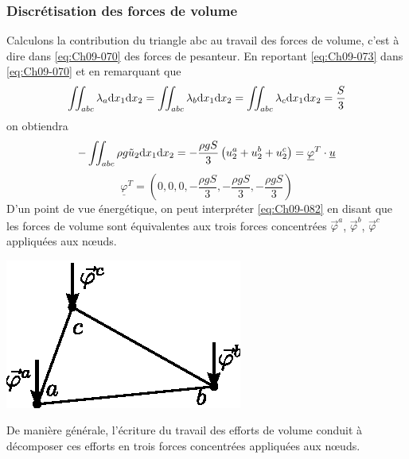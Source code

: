 \subsubsection{Discrétisation des forces de volume}
Calculons la contribution du triangle abc au travail des forces de volume, c'est à dire dans \eqref{eq:Ch09-070} des forces de pesanteur.
En reportant \eqref{eq:Ch09-073} dans \eqref{eq:Ch09-070} et en remarquant que 
\begin{equation}
    \iint_{abc} \lambda_a \mathrm{d} x_1 \mathrm{d} x_2 = \iint_{abc} \lambda_b \mathrm{d} x_1 \mathrm{d} x_2 = \iint_{abc} \lambda_c \mathrm{d} x_1 \mathrm{d} x_2 = \frac{S}{3}
    \label{eq:Ch09-081}
\end{equation}
on obtiendra
\begin{equation}
    -\iint_{abc} \rho g \tilde{u}_2 \mathrm{d} x_1 \mathrm{d} x_2 = - \frac{\rho g S}{3} \left( u_2^a + u_2^b + u_2^c \right) = \underline{\varphi}^T \cdot \underline{u}
    \label{eq:Ch09-082}
\end{equation}
\begin{equation}
    \underline{\varphi}^T = \left( 0, 0, 0, -\frac{\rho g S}{3}, -\frac{\rho g S}{3}, -\frac{\rho g S}{3} \right)
    \label{eq:Ch09-083}
\end{equation}
D'un point de vue énergétique, on peut interpréter \eqref{eq:Ch09-082} en disant que les forces de volume sont équivalentes aux trois forces concentrées $\vec{\varphi}^a$, $\vec{\varphi}^b$, $\vec{\varphi}^c$ appliquées aux nœuds. 
\begin{center}
    \includegraphics{../images/T1_Ch09-09}
\end{center}
De manière générale, l'écriture du travail des efforts de volume conduit à décomposer ces efforts en trois forces concentrées appliquées aux nœuds. 

